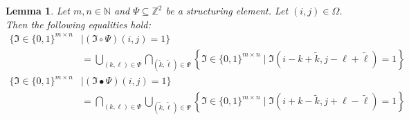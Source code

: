 \documentclass[a4paper,12pt]{article}
\theoremstyle{plain}
\newtheorem{lemma}[theorem]{Lemma}
\theoremstyle{definition}
\begin{document}
\begin{lemma}
	Let $m, n \in \mathbb{N}$ and $\Psi \subseteq \mathbb{Z}^2$ be a structuring element. Let $(i, j) \in \Omega$. Then the following equalities hold:
	\begin{equation}
		\begin{aligned}
			\big\{ \mathfrak{I} \in \{ 0, 1 \}^{m \times n} &\mid (\mathfrak{I} \circ \Psi)(i, j) = 1 \big\} \\
			&= \bigcup_{(k, \ell) \in \Psi} \bigcap_{(\tilde{k}, \tilde{\ell}) \in \Psi} \left\{ \mathfrak{I} \in \{ 0, 1 \}^{m \times n} \mid \mathfrak{I}(i - k + \tilde{k}, j - \ell + \tilde{\ell}) = 1 \right\} \label{eq: openingset}
		\end{aligned}
	\end{equation}
	\begin{equation}
		\begin{aligned}
			\big\{ \mathfrak{I} \in \{ 0, 1 \}^{m \times n} &\mid (\mathfrak{I} \bullet \Psi)(i, j) = 1 \big\} \\
			&= \bigcap_{(k, \ell) \in \Psi} \bigcup_{(\tilde{k}, \tilde{\ell}) \in \Psi} \left\{ \mathfrak{I} \in \{ 0, 1 \}^{m \times n} \mid \mathfrak{I}(i + k - \tilde{k}, j + \ell - \tilde{\ell}) = 1 \right\} \label{eq: closingset}
		\end{aligned}
	\end{equation}
\end{lemma}
\end{document}
